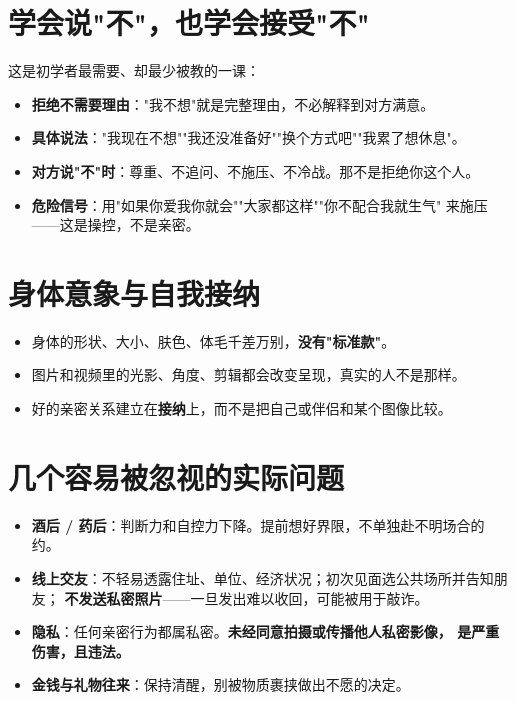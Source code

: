 \documentclass[12pt,UTF8,openany]{ctexbook}
\begin{document}
\section{学会说"不"，也学会接受"不"}

这是初学者最需要、却最少被教的一课：

\begin{itemize}[leftmargin=2em]
  \item \textbf{拒绝不需要理由}："我不想"就是完整理由，不必解释到对方满意。
  \item \textbf{具体说法}："我现在不想""我还没准备好""换个方式吧""我累了想休息"。
  \item \textbf{对方说"不"时}：尊重、不追问、不施压、不冷战。那不是拒绝你这个人。
  \item \textbf{危险信号}：用"如果你爱我你就会""大家都这样""你不配合我就生气"
        来施压——这是操控，不是亲密。
\end{itemize}

\section{身体意象与自我接纳}

\begin{itemize}[leftmargin=2em]
  \item 身体的形状、大小、肤色、体毛千差万别，\textbf{没有"标准款"}。
  \item 图片和视频里的光影、角度、剪辑都会改变呈现，真实的人不是那样。
  \item 好的亲密关系建立在\textbf{接纳}上，而不是把自己或伴侣和某个图像比较。
\end{itemize}

\section{几个容易被忽视的实际问题}

\begin{itemize}[leftmargin=2em]
  \item \textbf{酒后 / 药后}：判断力和自控力下降。提前想好界限，不单独赴不明场合的约。
  \item \textbf{线上交友}：不轻易透露住址、单位、经济状况；初次见面选公共场所并告知朋友；
        \textbf{不发送私密照片}——一旦发出难以收回，可能被用于敲诈。
  \item \textbf{隐私}：任何亲密行为都属私密。\textbf{未经同意拍摄或传播他人私密影像，
        是严重伤害，且违法。}
  \item \textbf{金钱与礼物往来}：保持清醒，别被物质裹挟做出不愿的决定。
\end{itemize}
\end{document}
